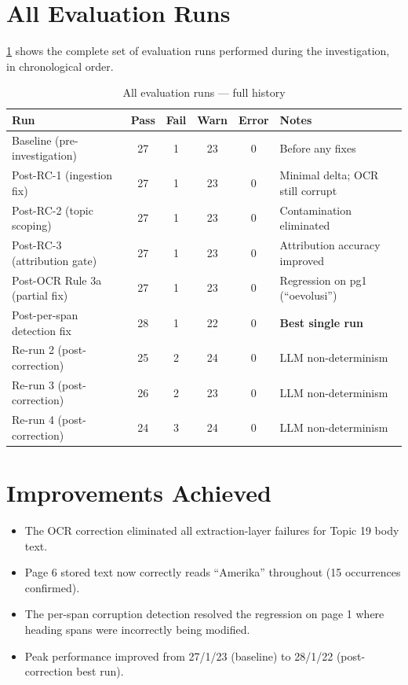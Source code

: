 \documentclass[12pt, a4paper]{report}
\begin{document}
\section{All Evaluation Runs}

\cref{tab:all_eval_runs} shows the complete set of evaluation runs performed
during the investigation, in chronological order.

\begin{table}[H]
  \centering
  \caption{All evaluation runs — full history}
  \label{tab:all_eval_runs}
  \begin{tabular}{lccccl}
    \toprule
    \textbf{Run} & \textbf{Pass} & \textbf{Fail} &
    \textbf{Warn} & \textbf{Error} & \textbf{Notes} \\
    \midrule
    Baseline (pre-investigation)
      & 27 & 1 & 23 & 0 & Before any fixes \\
    Post-RC-1 (ingestion fix)
      & 27 & 1 & 23 & 0 & Minimal delta; OCR still corrupt \\
    Post-RC-2 (topic scoping)
      & 27 & 1 & 23 & 0 & Contamination eliminated \\
    Post-RC-3 (attribution gate)
      & 27 & 1 & 23 & 0 & Attribution accuracy improved \\
    Post-OCR Rule 3a (partial fix)
      & 27 & 1 & 23 & 0 & Regression on pg1 (``oevolusi'') \\
    Post-per-span detection fix
      & 28 & 1 & 22 & 0 & \textbf{Best single run} \\
    Re-run 2 (post-correction)
      & 25 & 2 & 24 & 0 & LLM non-determinism \\
    Re-run 3 (post-correction)
      & 26 & 2 & 23 & 0 & LLM non-determinism \\
    Re-run 4 (post-correction)
      & 24 & 3 & 24 & 0 & LLM non-determinism \\
    \bottomrule
  \end{tabular}
\end{table}

\section{Improvements Achieved}

\begin{itemize}[noitemsep]
  \item The OCR correction eliminated all extraction-layer failures for
        Topic 19 body text.
  \item Page 6 stored text now correctly reads ``Amerika'' throughout
        (15 occurrences confirmed).
  \item The per-span corruption detection resolved the regression on page 1
        where heading spans were incorrectly being modified.
  \item Peak performance improved from 27/1/23 (baseline) to 28/1/22
        (post-correction best run).
\end{itemize}
\end{document}
